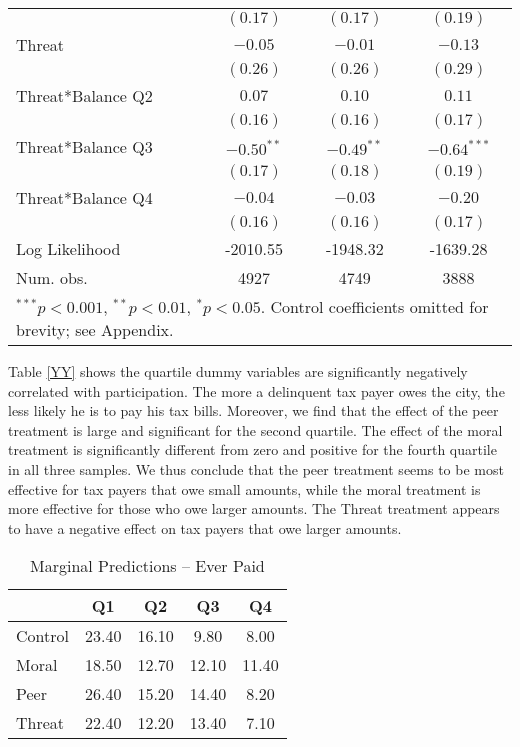 \documentclass[12pt,titlepage]{article}
\begin{document}
\begin{table}[htbp]
{\begin{center}
\begin{tabular}{l c c c }
                  & $(0.17)$      & $(0.17)$      & $(0.19)$      \\
Threat            & $-0.05$       & $-0.01$       & $-0.13$       \\
                  & $(0.26)$      & $(0.26)$      & $(0.29)$      \\
Threat*Balance Q2 & $0.07$        & $0.10$        & $0.11$        \\
                  & $(0.16)$      & $(0.16)$      & $(0.17)$      \\
Threat*Balance Q3 & $-0.50^{**}$  & $-0.49^{**}$  & $-0.64^{***}$ \\
                  & $(0.17)$      & $(0.18)$      & $(0.19)$      \\
Threat*Balance Q4 & $-0.04$       & $-0.03$       & $-0.20$       \\
                  & $(0.16)$      & $(0.16)$      & $(0.17)$      \\
\hline
Log Likelihood    & -2010.55      & -1948.32      & -1639.28      \\
Num. obs.         & 4927          & 4749          & 3888          \\
\hline
\multicolumn{4}{l}{\scriptsize{$^{***}p<0.001$, $^{**}p<0.01$, $^*p<0.05$. Control coefficients omitted for brevity; see Appendix.}}
\end{tabular}
\end{center}
}
\end{table}

Table \ref{YY} shows the quartile dummy variables are
significantly negatively correlated with participation. The more a delinquent
tax payer owes the city, the less likely he is to pay his tax
bills. Moreover, we find that the effect of the peer treatment is
large and significant for the second quartile. The effect of the moral
treatment is significantly different from zero and positive for the fourth
quartile in all three samples. We thus conclude that the peer
treatment seems to be most effective for tax payers that owe small
amounts, while the moral treatment is more effective for those who owe
larger amounts. The Threat treatment appears to have a negative effect
on tax payers that owe larger amounts.

\begin{table}[htbp]
\caption{Marginal  Predictions -- Ever Paid}  \label{ZZ}
\centering
\begin{tabular}{lcccc}
  \hline
 & Q1 & Q2 & Q3 & Q4 \\ 
  \hline
Control & 23.40 & 16.10 & 9.80 & 8.00 \\ 
  Moral & 18.50 & 12.70 & 12.10 & 11.40 \\ 
  Peer & 26.40 & 15.20 & 14.40 & 8.20 \\ 
  Threat & 22.40 & 12.20 & 13.40 & 7.10 \\ 
   \hline
\end{tabular}
\end{table}
\end{document}
